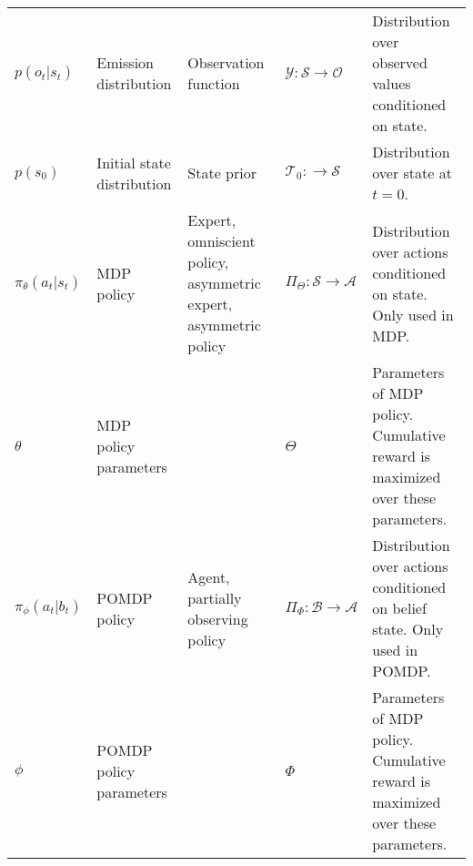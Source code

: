 \begin{minipage}{\textwidth}
\begin{adjustwidth}{-.5in}{-.5in}
\begin{center}
\begin{tabular}{@{}p{2cm}p{2cm}p{2cm}p{3cm}p{6.5cm}@{}}
$p(o_t | s_t)$                     & Emission distribution        & Observation function                                            & $\mathcal{Y} : \mathcal{S} \rightarrow \mathcal{O}$                                                                               & Distribution over observed values conditioned on state.                                                                                                                       \\
$p(s_0)$                           & Initial state distribution   & State prior                                                     & $\mathcal{T}_0 : \rightarrow \mathcal{S}$                                                                                         & Distribution over state at $t=0$.                                                                                                                                             \\
$\pi_{\theta}(a_t | s_t)$          & MDP policy                   & Expert, omniscient policy, asymmetric expert, asymmetric policy & $\Pi_{\Theta} : \mathcal{S} \rightarrow \mathcal{A}$                                                                              & Distribution over actions conditioned on state.  Only used in MDP.                                                                                                            \\
$\theta$                           & MDP policy parameters        &                                                                 & $\Theta$                                                                                                                          & Parameters of MDP policy.  Cumulative reward is maximized over these parameters.                                                                                              \\
$\pi_{\phi}(a_t | b_t)$            & POMDP policy                 & Agent, partially observing policy                               & $\Pi_{\Phi} : \mathcal{B} \rightarrow \mathcal{A}$                                                                                & Distribution over actions conditioned on belief state.  Only used in POMDP.                                                                                                   \\
$\phi$                             & POMDP policy parameters      &                                                                 & $\Phi$                                                                                                                            & Parameters of MDP policy.  Cumulative reward is maximized over these parameters.                                                                                              \\

\end{tabular}
\end{center}
\end{adjustwidth}
\end{minipage}
